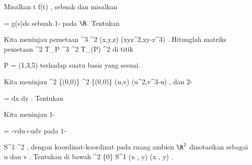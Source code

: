 {}
{

Misalkan
 {\R} {\R
} { t } {f(t)
} {,}
sebuah
dan misalkan

\mavergleichskette
{\vergleichskette
{ \omega
}
{ = }{ g(s)ds
}
{  }{
}
{    }{
}
{   }{
}
}
{}{}{}
sebuah
$1$-
pada $\R$. Tentukan

}
{} {}

{}
{

Kita meninjau pemetaan
\maabbeledisp {\varphi} {\R^3} {\R^2
} {(x,y,z)} {(xyz^2,xy-z^3)
} {.}
Hitunglah matriks pemetaan
 { \bigwedge^2 T_P \R^3 } { \bigwedge^2 T_{\varphi(P)}  \R^2
} {}
di titik

\mavergleichskette
{\vergleichskette
{ P
}
{ = }{ (1,3,5)
}
{  }{
}
{    }{
}
{   }{
}
}
{}{}{}
terhadap suatu basis yang sesuai.

}
{} {}

{}
{

Kita meninjau
\maabbeledisp {\varphi} {\R^2 \setminus \{(0,0)\}} {\R^2 \setminus \{(0,0)\}
} {(u,v)} {(u^2,v^3-u)
} {,}
dan
$2$-

\mavergleichskettedisp
{\vergleichskette
{ \omega
}
{ =} { {  } dx \wedge dy
}
{ } {
}
{ } {
}
{ } {
}
}
{}{}{.}
Tentukan


}
{} {}

{}
{

Kita meninjau
$1$-

\mavergleichskettedisp
{\vergleichskette
{ \omega
}
{ =} { -vdu+udv
}
{ } {
}
{ } {
}
{ } {
}
}
{}{}{}
pada
$1$-

\mavergleichskette
{\vergleichskette
{ S^1
}
{ \subset }{ \R^2
}
{  }{
}
{    }{
}
{   }{
}
}
{}{}{,}
dengan koordinat-koordinat pada ruang ambien $\R^2$ dinotasikan sebagai
\mathkor {} {u} {dan} {v} {.}
Tentukan
\mathl{\pi^* \omega}{} di bawah
\maabbeledisp {\pi} {\R^2 \setminus \{0\}} { S^{1}
} {(x , y) } { {  } (x , y)
} {.}

}
{} {}

